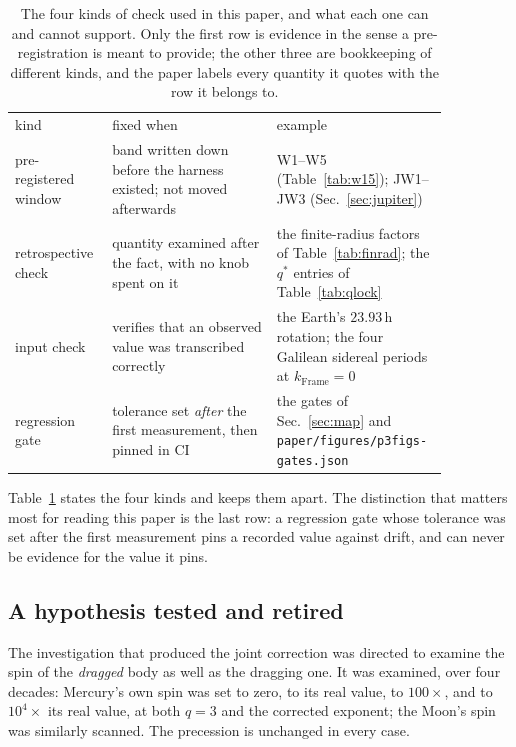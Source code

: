 \documentclass[aps,reprint,amsmath,amssymb,nofootinbib,superscriptaddress,floatfix]{revtex4-2}
\begin{document}
\begin{table}[t]
\caption{The four kinds of check used in this paper, and what each one
  can and cannot support. Only the first row is evidence in the sense a
  pre-registration is meant to provide; the other three are bookkeeping
  of different kinds, and the paper labels every quantity it quotes with
  the row it belongs to.}
\label{tab:checkkinds}
\begin{ruledtabular}
\begin{tabular}{p{0.20\linewidth}p{0.36\linewidth}p{0.30\linewidth}}
kind & fixed when & example \\
\colrule
pre-registered window &
  band written down before the harness existed; not moved afterwards &
  W1--W5 (Table~\ref{tab:w15}); JW1--JW3 (Sec.~\ref{sec:jupiter}) \\
retrospective check &
  quantity examined after the fact, with no knob spent on it &
  the finite-radius factors of Table~\ref{tab:finrad}; the $q^{*}$
  entries of Table~\ref{tab:qlock} \\
input check &
  verifies that an observed value was transcribed correctly &
  the Earth's $23.93$\,h rotation; the four Galilean sidereal periods
  at $k_{\mathrm{Frame}}{=}0$ \\
regression gate &
  tolerance set \emph{after} the first measurement, then pinned in CI &
  the gates of Sec.~\ref{sec:map} and
  \texttt{paper/\allowbreak figures/\allowbreak p3figs-\allowbreak gates.json} \\
\end{tabular}
\end{ruledtabular}
\end{table}

Table~\ref{tab:checkkinds} states the four kinds and keeps them apart.
The distinction that matters most for reading this paper is the last
row: a regression gate whose tolerance was set after the first
measurement pins a recorded value against drift, and can never be
evidence for the value it pins.

\subsection{A hypothesis tested and retired}
\label{sec:p4spin}

The investigation that produced the joint correction was directed to
examine the spin of the \emph{dragged} body as well as the dragging
one.
It was examined, over four decades: Mercury's own spin was set to zero,
to its real value, to $100\times$, and to $10^{4}\times$ its real
value, at both $q=3$ and the corrected exponent; the Moon's spin was
similarly scanned.
The precession is unchanged in every case.
\end{document}
